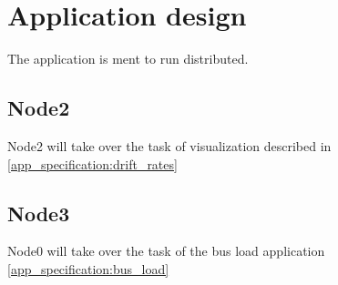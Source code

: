 \section{Application design}

The application is ment to run distributed.

\subsection{Node2}
Node2 will take over the task of visualization described in
\ref{app_specification:drift_rates} 

\subsection{Node3}
Node0 will take over the task of the bus load application
\ref{app_specification:bus_load} 